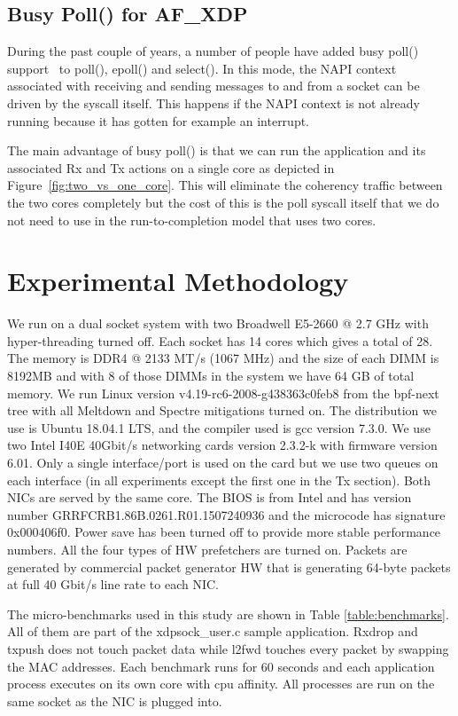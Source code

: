 \documentclass[9pt,numbers,reprint]{sigplanconf}
\begin{document}
\subsection{Busy Poll() for AF\_XDP}

During the past couple of years, a number of people have added busy
poll() support~\cite{busy_poll} to poll(), epoll() and select(). In
this mode, the NAPI context associated with receiving and sending
messages to and from a socket can be driven by the syscall
itself. This happens if the NAPI context is not already running
because it has gotten for example an interrupt.

The main advantage of busy poll() is that we can run the application
and its associated Rx and Tx actions on a single core as depicted in
Figure~\ref{fig:two_vs_one_core}. This will eliminate the coherency
traffic between the two cores completely but the cost of this is the
poll syscall itself that we do not need to use in the
run-to-completion model that uses two cores.


\section{Experimental Methodology}
\label{sec:exp:meth}

We run on a dual socket system with two Broadwell E5-2660 @ 2.7 GHz
with hyper-threading turned off. Each socket has 14 cores which gives a
total of 28. The memory is DDR4 @ 2133 MT/s (1067 MHz) and the size of
each DIMM is 8192MB and with 8 of those DIMMs in the system we have 64
GB of total memory. We run Linux version v4.19-rc6-2008-g438363c0feb8
from the bpf-next tree with all Meltdown and Spectre mitigations
turned on. The distribution we use is Ubuntu 18.04.1 LTS, and the
compiler used is gcc version 7.3.0. We use two Intel I40E 40Gbit/s
networking cards version 2.3.2-k with firmware version 6.01. Only a
single interface/port is used on the card but we use two queues on
each interface (in all experiments except the first one in the Tx
section). Both NICs are served by the same core. The BIOS is from
Intel and has version number GRRFCRB1.86B.0261.R01.1507240936 and the
microcode has signature 0x000406f0. Power save has been turned off to
provide more stable performance numbers. All the four types of HW
prefetchers are turned on. Packets are generated by commercial packet
generator HW that is generating 64-byte packets at full 40 Gbit/s line
rate to each NIC.

The micro-benchmarks used in this study are shown in Table
\ref{table:benchmarks}. All of them are part of the xdpsock\_user.c
sample application. Rxdrop and txpush does not touch packet data
while l2fwd touches every packet by swapping the MAC addresses. Each
benchmark runs for 60 seconds and each application process executes on
its own core with cpu affinity. All processes are run on the same
socket as the NIC is plugged into.
\end{document}
